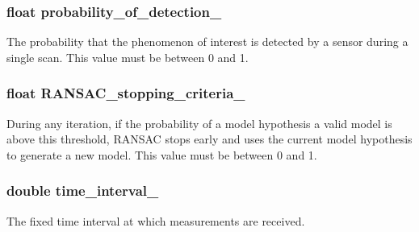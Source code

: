 \subsubsection[{\texorpdfstring{probability\+\_\+of\+\_\+detection\+\_\+}{probability_of_detection_}}]{\setlength{\rightskip}{0pt plus 5cm}float probability\+\_\+of\+\_\+detection\+\_\+}\hypertarget{classrransac_1_1Parameters_abf6cddca971bcdcbddb5910c275242db}{}\label{classrransac_1_1Parameters_abf6cddca971bcdcbddb5910c275242db}
The probability that the phenomenon of interest is detected by a sensor during a single scan. This value must be between 0 and 1. 
\subsubsection[{\texorpdfstring{R\+A\+N\+S\+A\+C\+\_\+stopping\+\_\+criteria\+\_\+}{RANSAC_stopping_criteria_}}]{\setlength{\rightskip}{0pt plus 5cm}float R\+A\+N\+S\+A\+C\+\_\+stopping\+\_\+criteria\+\_\+}\hypertarget{classrransac_1_1Parameters_a08b9e2dd746364297730dda857bdfaea}{}\label{classrransac_1_1Parameters_a08b9e2dd746364297730dda857bdfaea}
During any iteration, if the probability of a model hypothesis a valid model is above this threshold, R\+A\+N\+S\+AC stops early and uses the current model hypothesis to generate a new model. This value must be between 0 and 1. 
\subsubsection[{\texorpdfstring{time\+\_\+interval\+\_\+}{time_interval_}}]{\setlength{\rightskip}{0pt plus 5cm}double time\+\_\+interval\+\_\+}\hypertarget{classrransac_1_1Parameters_a436968a7b7d79bfb60b1dd0ebb4abee3}{}\label{classrransac_1_1Parameters_a436968a7b7d79bfb60b1dd0ebb4abee3}
The fixed time interval at which measurements are received. 
